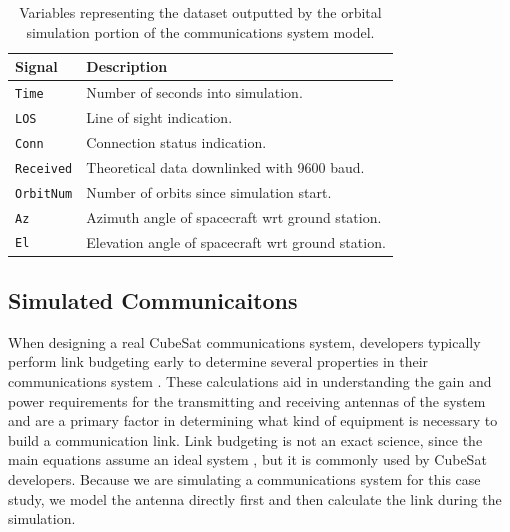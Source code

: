 \documentclass[conf]{new-aiaa}
\begin{document}
\begin{table}[!h]
\centering
\begin{tabular}{ll} 
\hline\hline
\textbf{Signal} & \textbf{Description}                               \\ 
\hline
\texttt{Time}            & Number of seconds into simulation.                 \\
\texttt{LOS}             & Line of sight indication.                          \\
\texttt{Conn}            & Connection status indication.                      \\
\texttt{Received}        & Theoretical data downlinked with 9600 baud.        \\
\texttt{OrbitNum}        & Number of orbits since simulation start.           \\
\texttt{Az}              & Azimuth angle of spacecraft wrt ground station.    \\
\texttt{El}              & Elevation angle of spacecraft wrt ground station.  \\
\hline\hline
\end{tabular}
\caption{Variables representing the dataset outputted by the orbital simulation portion of the communications system model.}
\label{GroundStationVariables}
\end{table}

\subsection{Simulated Communicaitons}
\label{ref:comm}

When designing a real CubeSat communications system, developers typically perform link budgeting early to determine several properties in their communications system \cite{daylee2018}. These calculations aid in understanding the gain and power requirements for the transmitting and receiving antennas of the system and are a primary factor in determining what kind of equipment is necessary to build a communication link. Link budgeting is not an exact science, since the main equations assume an ideal system \cite{Zyren1998}, but it is commonly used by CubeSat developers. Because we are simulating a communications system for this case study, we model the antenna directly first and then calculate the link during the simulation.
\end{document}
